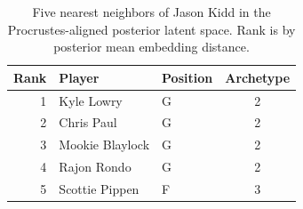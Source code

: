 \begin{table}[htbp]
  \centering\small
  \begin{tabular}{rllc}
    \toprule
    Rank & Player & Position & Archetype \\
    \midrule
    1 & Kyle Lowry & G & 2 \\
    2 & Chris Paul & G & 2 \\
    3 & Mookie Blaylock & G & 2 \\
    4 & Rajon Rondo & G & 2 \\
    5 & Scottie Pippen & F & 3 \\
    \bottomrule
  \end{tabular}
  \caption{Five nearest neighbors of Jason Kidd in the Procrustes-aligned posterior latent space. Rank is by posterior mean embedding distance.}
  \label{tab:Jason_Kidd_neighbors}
\end{table}

